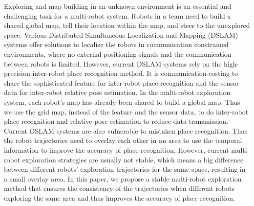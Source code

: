 Exploring and map building in an unknown environment is an essential and challenging task for a multi-robot system. 
Robots in a team need to build a shared global map, tell their location within the map, and steer to the unexplored space.
Various Distributed Simultaneous Localization and Mapping (DSLAM) systems offer solutions to localize the robots in communication constrained environments, where no external positioning signals and the communication between robots is limited.
However, current DSLAM systems rely on the high-precision inter-robot place recognition method. It is communication-costing to share the sophisticated feature for inter-robot place recognition and the sensor data for inter-robot relative pose estimation.
In the multi-robot exploration system, each robot's map has already been shared to build a global map.
Thus we use the grid map, instead of the feature and the sensor data, to do inter-robot place recognition and relative pose estimation to reduce data transmission.
Current DSLAM systems are also vulnerable to mistaken place recognition. Thus the robot trajectories need to overlay each other in an area to use the temporal information to improve the accuracy of place recognition.
However, current multi-robot exploration strategies are usually not stable, which means a big difference between different robots' exploration trajectories for the same space, resulting in a small overlay area.
In this paper, we propose a stable multi-robot exploration method that ensures the consistency of the trajectories when different robots exploring the same area and thus improves the accuracy of place recognition.